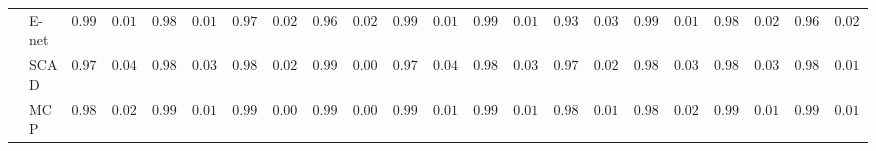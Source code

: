 \begin{tabular}{ll|ll|llllll|llllll|llllll}
 & E-net  & $0.9943$ & $0.0145$ & $0.9883$ & $0.0195$ & $0.9778$ & $0.0222$ & $0.9696$ & $0.0268$ & $0.9934$ & $0.0124$ & $0.9906$ & $0.0145$ & $0.9311$ & $0.0361$ & $0.9907$ & $0.0168$ & $0.9804$ & $0.0229$ & $0.9617$ & $0.0225$ \\
 & SCAD  & $0.9791$ & $0.0413$ & $0.9828$ & $0.0353$ & $0.9889$ & $0.0207$ & $0.9972$ & $0.0082$ & $0.9785$ & $0.0443$ & $0.9846$ & $0.0384$ & $0.9727$ & $0.0277$ & $0.9834$ & $0.0349$ & $0.9840$ & $0.0310$ & $0.9826$ & $0.0174$ \\
 & MCP  & $0.9898$ & $0.0211$ & $0.9915$ & $0.0193$ & $0.9962$ & $0.0095$ & $0.9984$ & $0.0050$ & $0.9911$ & $0.0176$ & $0.9931$ & $0.0173$ & $0.9850$ & $0.0168$ & $0.9895$ & $0.0234$ & $0.9928$ & $0.0159$ & $0.9900$ & $0.0106$ \\
\hline 
\end{tabular}

